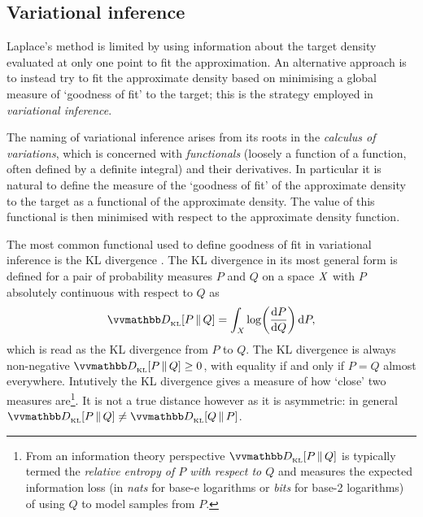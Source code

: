 \subsection{Variational inference}

Laplace's method is limited by using information about the target density evaluated at only one point to fit the approximation. An alternative approach is to instead try to fit the approximate density based on minimising a global measure of `goodness of fit' to the target; this is the strategy employed in \emph{variational inference}.

The naming of variational inference arises from its roots in the \emph{calculus of variations}, which is concerned with \emph{functionals} (loosely a function of a function, often defined by a definite integral) and their derivatives. In particular it is natural to define the measure of the `goodness of fit' of the approximate density to the target as a functional of the approximate density. The value of this functional is then minimised with respect to the approximate density function. %

The most common functional used to define goodness of fit in variational inference is the \ac{KL} divergence \citep{kullback1951information}. The \ac{KL} divergence in its most general form is defined for a pair of probability measures $P$ and $Q$ on a space $\mathit{X}$ with $P$ absolutely continuous with respect to $Q$ as
\begin{equation}\label{eq:kullback-leibler-probability-measures}
  \kldiv{P}{Q} =
  \int_{\set{X}} \log\lpa\td{P}{Q}\rpa \,\dr P,
\end{equation}
which is read as the \ac{KL} divergence from $P$ to $Q$. The \ac{KL} divergence is always non-negative $\kldiv{P}{Q} \geq 0$, with equality if and only if $P = Q$ almost everywhere. Intutively the \ac{KL} divergence gives a measure of how `close' two measures are\footnote{From an information theory perspective $\kldiv{P}{Q}$ is typically termed the \emph{relative entropy of $P$ with respect to $Q$} and measures the expected information loss (in \emph{nats} for base-$\mathrm{e}$ logarithms or \emph{bits} for base-2 logarithms) of using $Q$ to model samples from $P$.}. It is not a true distance however as it is asymmetric: in general $\kldiv{P}{Q} \neq \kldiv{Q}{P}$.

